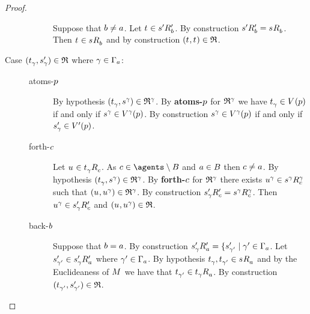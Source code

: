 \begin{proof}
\begin{description}
\begin{description}
                Suppose that $\agentB \neq \agentA$.
                Let $\kStateT \in \kSuccessorsPB{\kStateSP}$.
                By construction $\kSuccessorsPB{\kStateSP} = \kSuccessorsB{\kStateS}$.
                Then $\kStateT \in \kSuccessorsB{\kStateS}$ and by construction $(\kStateT, \kStateT) \in \refinement$.
        \end{description}
\pagebreak
    \item[Case $(\kStateT_\gamma, \kStateSP_\gamma) \in \refinement$ where $\gamma \in \Gamma_\agentA$:]
        \hfill
        \begin{description}
            \item[atoms-$\atomP$] 
                By hypothesis $(\kStateT_\gamma, \kStateS[\gamma]) \in \refinement^\gamma$.
                By {\bf atoms-$\atomP$} for $\refinement^\gamma$ we have $\kStateT_\gamma \in \kValuation(\atomP)$ if and only if $\kStateS[\gamma] \in \kValuation[\gamma](\atomP)$.
                By construction $\kStateS[\gamma] \in \kValuation[\gamma](\atomP)$ if and only if $\kStateSP_\gamma \in \kValuationP(\atomP)$.
            \item[forth-$\agentC$]
                Let $\kStateU \in \kSuccessorsC{\kStateT_\gamma}$.
                As $\agentC \in \agents \setminus \agentsB$ and $\agentA \in \agentsB$ then $\agentC \neq \agentA$.
                By hypothesis $(\kStateT_\gamma, \kStateS[\gamma]) \in \refinement^\gamma$.
                By {\bf forth-$\agentC$} for $\refinement^\gamma$ there exists $\kStateU[\gamma] \in \kSuccessorsC[\gamma]{\kStateS[\gamma]}$ such that $(\kStateU, \kStateU[\gamma]) \in \refinement^\gamma$.
                By construction $\kSuccessorsPC{\kStateSP_\gamma} = \kSuccessorsC[\gamma]{\kStateS[\gamma]}$.
                Then $\kStateU[\gamma] \in \kSuccessorsPC{\kStateSP_\gamma}$ and $(\kStateU, \kStateU[\gamma]) \in \refinement$.
            \item[back-$\agentB$]
                Suppose that $\agentB = \agentA$.
                By construction $\kSuccessorsPA{\kStateSP_\gamma} = \{\kStateSP_{\gamma'} \mid \gamma' \in \Gamma_\agentA$.
                Let $\kStateSP_{\gamma'} \in \kSuccessorsPA{\kStateSP_\gamma}$ where $\gamma' \in \Gamma_\agentA$.
                By hypothesis $\kStateT_{\gamma}, \kStateT_{\gamma'} \in \kSuccessorsA{\kStateS}$ and by the Euclideaness of $\kModel$ we have that $\kStateT_{\gamma'} \in \kSuccessorsA{\kStateT_\gamma}$.
                By construction $(\kStateT_{\gamma'}, \kStateSP_{\gamma'}) \in \refinement$.


\end{description}
\end{description}
\end{proof}
